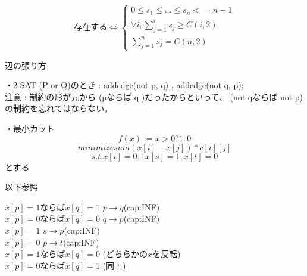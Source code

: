 \[存在する \Leftrightarrow \begin{cases}
0 \leq s_1 \leq ... \leq s_n <= n-1 \\
\forall i, \sum_{j=1}^{i} s_j \geq C(i,2) \\
\sum_{j=1}^{n} s_j = C(n,2)
\end{cases} \]


辺の張り方

・2-SAT
(P or Q)のとき : addedge(not p, q) , addedge(not q, p); \\

注意 : 制約の形が元から (pならば q )だったからといって、
(not qならば not p)の制約を忘れてはならない。


・最小カット
\[f(x) := x>0 ? 1 : 0\]
\[minimize sum(x[i] - x[j]) * c[i][j]\]
\[s.t. x[i]=0,1 x[s]=1, x[t]=0\]
とする

以下参照

$x[p]=1$ならば$x[q]=1$  $p \rightarrow q$(cap:INF)\\
$x[p]=0$ならば$x[q]=0$	$q \rightarrow p$(cap:INF)\\
$x[p]=1$ $s \rightarrow p$(cap:INF)\\
$x[p]=0$ $p \rightarrow t$(cap:INF)\\
$x[p]=1$ならば$x[q]=0$	(どちらかの$x$を反転)\\
$x[p]=0$ならば$x[q]=1$	(同上)\\

